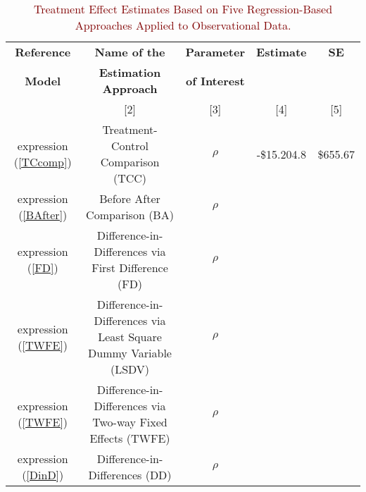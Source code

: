 \documentclass{article}
\begin{document}
\begin{table}[ht!]
\centering
\colorbox{lightmaroon}{
{\color{Maroon}
\begin{tabular}{ccccc}
\hline
\textbf{Reference} & \multicolumn{1}{c}{\textbf{Name of the }} & \textbf{Parameter} & \multicolumn{1}{c}{\textbf{Estimate}} & \textbf{SE} \\
\textbf{Model} & \multicolumn{1}{c}{\textbf{Estimation Approach}}            & \textbf{of Interest} &  &  \\ \hline
[1] & [2] & [3] & [4] & [5]  \\ \hline
expression (\ref{TCcomp})                 & Treatment-Control Comparison (TCC)                    & $\rho$             & -\$15.204.8  &  \$655.67  \\
expression (\ref{BAfter})                 & Before After Comparison (BA) & $\rho$             &  &  \\
expression (\ref{FD})                 & Difference-in-Differences via First Difference (FD) & $\rho$             &  &  \\
expression (\ref{TWFE})                 & Difference-in-Differences via Least Square Dummy Variable (LSDV) & $\rho$             &  &  \\
expression (\ref{TWFE})                 & Difference-in-Differences via Two-way Fixed Effects (TWFE) & $\rho$             &  &  \\
expression (\ref{DinD})                 & Difference-in-Differences (DD) & $\rho$             &  &  \\
\hline
\end{tabular}}}
\caption{\textcolor{Maroon}{Treatment Effect Estimates Based on Five Regression-Based Approaches Applied to Observational Data.}}
\label{tab:reg-specs}
\end{table}
\end{document}
